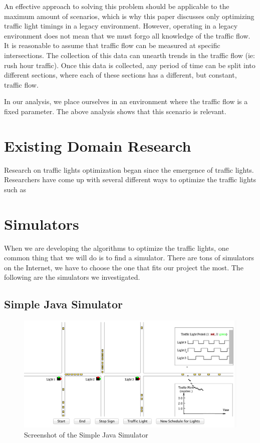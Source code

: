 \documentclass{article} %
\begin{document}
An effective approach to solving this problem should be applicable to the maximum amount of scenarios, which is why this paper discusses only optimizing traffic light timings in a legacy environment.
However, operating in a legacy environment does not mean that we must forgo all knowledge of the traffic flow. It is reasonable to assume that traffic flow can be measured at specific intersections. The collection of this data can unearth trends in the traffic flow (ie: rush hour traffic). Once this data is collected, any period of time can be split into different sections, where each of these sections has a different, but constant, traffic flow.


In our analysis, we place ourselves in an environment where the traffic flow is a fixed parameter. The above analysis shows that this scenario is relevant.

\section{Existing Domain Research}
Research on traffic lights optimization began since the emergence of traffic lights. Researchers have come up with several different ways to optimize the traffic lights such as 

\section{Simulators}
\label{gen_inst}

When we are developing the algorithms to optimize the traffic lights, one common thing that we will do is to find a simulator. There are tons of simulators on the Internet, we have to choose the one that fits our project the most. The following are the simulators we investigated.
\subsection{Simple Java Simulator}
\begin{figure}
\caption{Screenshot of the Simple Java Simulator}
 \includegraphics[width=\textwidth]{images/SimpleJavaSimulator.png} 
\end{figure}
\end{document}
